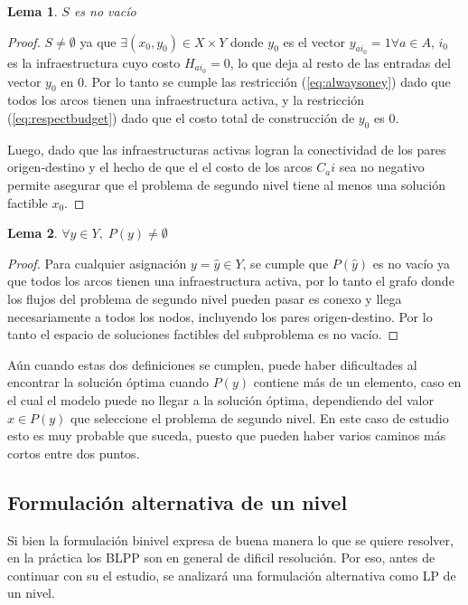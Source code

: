 \documentclass{article}
\newtheorem{lemma}{Lema}
\begin{document}
  \begin{lemma}$S$ es no vacío
  \end{lemma}

  \begin{proof}
    $S \neq \emptyset$ ya que $\exists (x_0, y_0) \in X \times Y$ donde $y_0$ es el vector $y_{ai_0} = 1 \forall a \in A$, $i_0$ es la infraestructura cuyo costo $H_{ai_0} = 0$, lo que deja al resto de las entradas del vector $y_0$ en $0$. Por lo tanto se cumple las restricción (\ref{eq:alwaysoney}) dado que todos los arcos tienen una infraestructura activa, y la restricción (\ref{eq:respectbudget}) dado que el costo total de construcción de $y_0$ es $0$.

    Luego, dado que las infraestructuras activas logran la conectividad de los pares origen-destino y el hecho de que el el costo de los arcos $C_ai$ sea no negativo permite asegurar que el problema de segundo nivel tiene al menos una solución factible $x_0$.
  \end{proof}

  \begin{lemma}$\forall y \in Y,\; P(y) \neq \emptyset$
  \end{lemma}

  \begin{proof}
    Para cualquier asignación $y = \hat{y} \in Y$, se cumple que $P(\hat{y})$ es no vacío ya que todos los arcos tienen una infraestructura activa, por lo tanto el grafo donde los flujos del problema de segundo nivel pueden pasar es conexo y llega necesariamente a todos los nodos, incluyendo los pares origen-destino. Por lo tanto el espacio de soluciones factibles del subproblema es no vacío. 
  \end{proof}

  Aún cuando estas dos definiciones se cumplen, puede haber dificultades al encontrar la solución óptima cuando $P(y)$ contiene más de un elemento, caso en el cual el modelo puede no llegar a la solución óptima, dependiendo del valor $x \in P(y)$ que seleccione el problema de segundo nivel. En este caso de estudio esto es muy probable que suceda, puesto que pueden haber varios caminos más cortos entre dos puntos.

  \subsection*{Formulación alternativa de un nivel}

  Si bien la formulación binivel expresa de buena manera lo que se quiere resolver, en la práctica los BLPP son en general de dificil resolución. Por eso, antes de continuar con su el estudio, se analizará una formulación alternativa como LP de un nivel.
\end{document}
